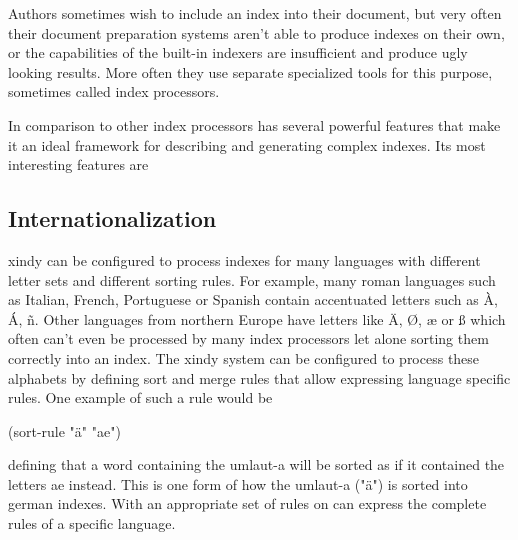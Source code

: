 Authors sometimes wish to include an index into their document, but very often their document preparation systems aren't able to produce indexes on their own, or the capabilities of the built-in indexers are insufficient and produce ugly looking results. More often they use separate specialized tools for this purpose, sometimes called index processors.

In comparison to other index processors  has several powerful features that make it an ideal framework for describing and generating complex indexes. Its most interesting features are

\subsection{Internationalization}

xindy can be configured to process indexes for many languages with different letter sets and different sorting rules. For example, many roman languages such as Italian, French, Portuguese or Spanish contain accentuated letters such as À, Á, ñ. Other languages from northern Europe have letters like Ä, Ø, æ or ß which often can't even be processed by many index processors let alone sorting them correctly into an index. The xindy system can be configured to process these alphabets by defining sort and merge rules that allow expressing language specific rules. One example of such a rule would be

(sort-rule "ä" "ae")

defining that a word containing the umlaut-a will be sorted as if it contained the letters ae instead. This is one form of how the umlaut-a ("ä") is sorted into german indexes. With an appropriate set of rules on can express the complete rules of a specific language.
\endinput




















